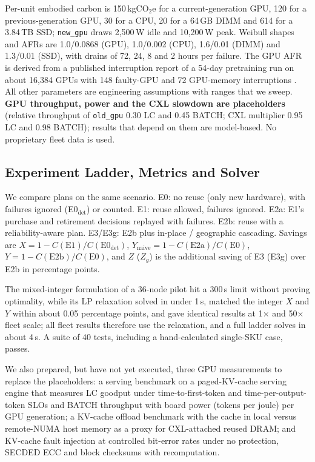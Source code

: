 Per-unit embodied carbon is 150\,kgCO$_2$e for a current-generation GPU, 120 for a previous-generation GPU, 30 for a CPU, 20 for a 64\,GB DIMM and 614 for a 3.84\,TB SSD; \texttt{new\_gpu} draws 2{,}500\,W idle and 10{,}200\,W peak. Weibull shapes and AFRs are 1.0/0.0868 (GPU), 1.0/0.002 (CPU), 1.6/0.01 (DIMM) and 1.3/0.01 (SSD), with drains of 72, 24, 8 and 2 hours per failure. The GPU AFR is derived from a published interruption report of a 54-day pretraining run on about 16{,}384 GPUs with 148 faulty-GPU and 72 GPU-memory interruptions \citep{llama3}. All other parameters are engineering assumptions with ranges that we sweep. \textbf{GPU throughput, power and the CXL slowdown are placeholders} (relative throughput of \texttt{old\_gpu} 0.30 LC and 0.45 BATCH; CXL multiplier 0.95 LC and 0.98 BATCH); results that depend on them are model-based. No proprietary fleet data is used.

\subsection{Experiment Ladder, Metrics and Solver}
We compare plans on the same scenario. E0: no reuse (only new hardware), with failures ignored (E0$_\text{det}$) or counted. E1: reuse allowed, failures ignored. E2a: E1's purchase and retirement decisions replayed with failures. E2b: reuse with a reliability-aware plan. E3/E3g: E2b plus in-place / geographic cascading. Savings are $X=1-C(\text{E1})/C(\text{E0}_\text{det})$, $Y_\text{naive}=1-C(\text{E2a})/C(\text{E0})$, $Y=1-C(\text{E2b})/C(\text{E0})$, and $Z$ ($Z_g$) is the additional saving of E3 (E3g) over E2b in percentage points.

The mixed-integer formulation of a 36-node pilot hit a 300\,s limit without proving optimality, while its LP relaxation solved in under 1\,s, matched the integer $X$ and $Y$ within about 0.05 percentage points, and gave identical results at 1$\times$ and 50$\times$ fleet scale; all fleet results therefore use the relaxation, and a full ladder solves in about 4\,s. A suite of 40 tests, including a hand-calculated single-SKU case, passes.

We also prepared, but have not yet executed, three GPU measurements to replace the placeholders: a serving benchmark on a paged-KV-cache serving engine \citep{kwon2023vllm} that measures LC goodput under time-to-first-token and time-per-output-token SLOs and BATCH throughput with board power (tokens per joule) per GPU generation; a KV-cache offload benchmark with the cache in local versus remote-NUMA host memory as a proxy for CXL-attached reused DRAM; and KV-cache fault injection at controlled bit-error rates under no protection, SECDED ECC and block checksums with recomputation.

